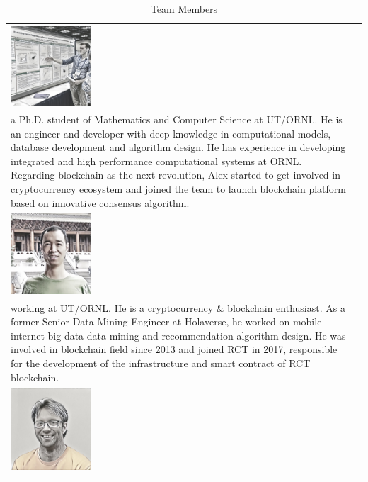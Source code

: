 \documentclass[a4paper,oneside,openany]{tufte-book}
\begin{document}
\begin{table}[ht]
\centering
\caption{Team Members}
\label{tab_teamMembers}
\begin{tabular}{ l | l }
     \includegraphics[width=30mm]{fig/p2} & \begin{minipage}{40em}
  \emph{Alexander Cope} \\ a Ph.D. student of Mathematics and Computer Science at UT/ORNL. He is an engineer and developer with deep knowledge in computational models, database development and algorithm design. He has experience in developing integrated and high performance computational systems at ORNL. Regarding blockchain as the next revolution, Alex started to get involved in cryptocurrency ecosystem and joined the team to launch blockchain platform based on innovative consensus algorithm.
\end{minipage}\\
     \includegraphics[width=30mm]{fig/p4} &\begin{minipage}{40em}
  \emph{Jason Lian} \\ working at UT/ORNL. He is a cryptocurrency \& blockchain enthusiast. As a former Senior Data Mining Engineer at Holaverse, he worked on mobile internet big data data mining and recommendation algorithm design. He was involved in blockchain field since 2013 and joined RCT in 2017, responsible for the development of the infrastructure and smart contract of RCT blockchain.
\end{minipage} \\
      \includegraphics[width=30mm]{fig/p3}     &\begin{minipage}{40em}

\end{minipage}
\end{tabular}
\end{table}
\end{document}

